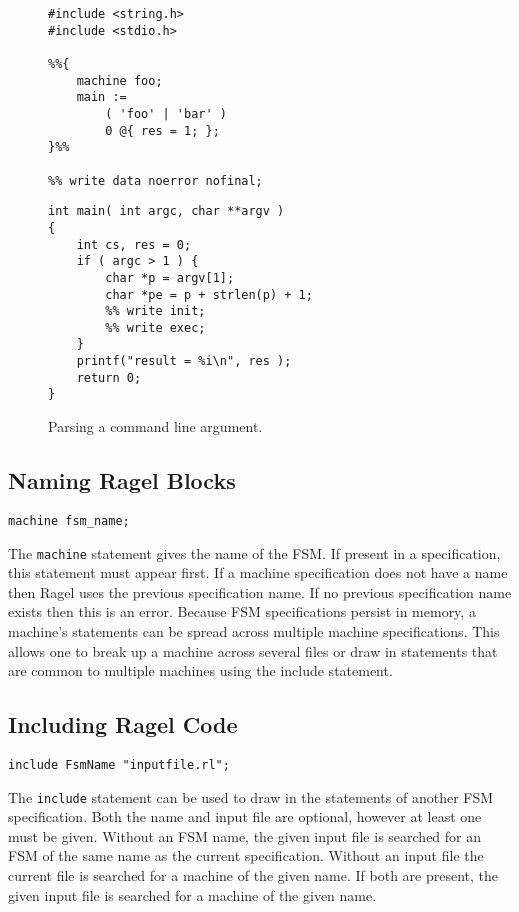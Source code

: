 \documentclass[letterpaper,11pt,oneside]{book}
\newcommand{\verbspace}{\vspace{10pt}}
\begin{document}
\begin{figure}
\begin{multicols}{2}
\small
\begin{verbatim}
#include <string.h>
#include <stdio.h>

%%{ 
    machine foo;
    main := 
        ( 'foo' | 'bar' ) 
        0 @{ res = 1; };
}%%

%% write data noerror nofinal;
\end{verbatim}
\columnbreak
\begin{verbatim}
int main( int argc, char **argv )
{
    int cs, res = 0;
    if ( argc > 1 ) {
        char *p = argv[1];
        char *pe = p + strlen(p) + 1;
        %% write init;
        %% write exec;
    }
    printf("result = %i\n", res );
    return 0;
}
\end{verbatim}
\end{multicols}
\caption{Parsing a command line argument.}
\label{cmd-line-parsing}
\end{figure}


\subsection{Naming Ragel Blocks}

\begin{verbatim}
machine fsm_name;
\end{verbatim}
\verbspace

The \verb|machine| statement gives the name of the FSM. If present in a
specification, this statement must appear first. If a machine specification
does not have a name then Ragel uses the previous specification name.  If no
previous specification name exists then this is an error. Because FSM
specifications persist in memory, a machine's statements can be spread across
multiple machine specifications.  This allows one to break up a machine across
several files or draw in statements that are common to multiple machines using
the include statement.

\subsection{Including Ragel Code}

\begin{verbatim}
include FsmName "inputfile.rl";
\end{verbatim}
\verbspace

The \verb|include| statement can be used to draw in the statements of another FSM
specification. Both the name and input file are optional, however at least one
must be given. Without an FSM name, the given input file is searched for an FSM
of the same name as the current specification. Without an input file the
current file is searched for a machine of the given name. If both are present,
the given input file is searched for a machine of the given name.
\end{document}
